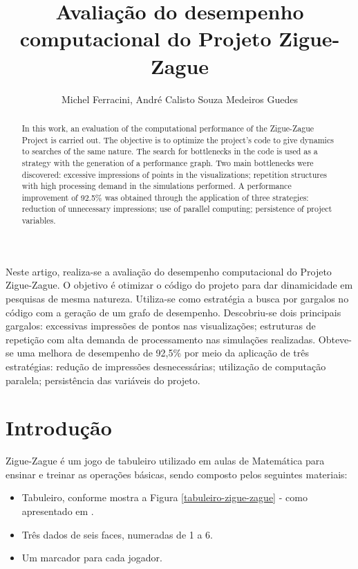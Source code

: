 \documentclass[12pt]{article}
\title{Avaliação do desempenho computacional do Projeto Zigue-Zague}
\author{Michel Ferracini\inst{1}, André Calisto Souza Medeiros Guedes\inst{1}}
\begin{document}
 

\maketitle

\begin{abstract}
  In this work, an evaluation of the computational performance of the Zigue-Zague Project is carried out. The objective is to optimize the project's code to give dynamics to searches of the same nature. The search for bottlenecks in the code is used as a strategy with the generation of a performance graph. Two main bottlenecks were discovered: excessive impressions of points in the visualizations; repetition structures with high processing demand in the simulations performed. A performance improvement of 92.5\% was obtained through the application of three strategies: reduction of unnecessary impressions; use of parallel computing; persistence of project variables.
\end{abstract}
     
\begin{resumo} 
Neste artigo, realiza-se a avaliação do desempenho computacional do Projeto Zigue-Zague. O objetivo é otimizar o código do projeto para dar dinamicidade em pesquisas de mesma natureza. Utiliza-se como estratégia a busca por gargalos no código com a geração de um grafo de desempenho. Descobriu-se dois principais gargalos: excessivas impressões de pontos nas visualizações; estruturas de repetição com alta demanda de processamento nas simulações realizadas. Obteve-se uma melhora de desempenho de 92,5\% por meio da aplicação de três estratégias: redução de impressões desnecessárias; utilização de computação paralela; persistência das variáveis do projeto. 
\end{resumo}

\section{Introdução}

Zigue-Zague é um jogo de tabuleiro utilizado em aulas de Matemática para ensinar e treinar as operações básicas, sendo composto pelos seguintes materiais:

\begin{itemize}
	\item Tabuleiro, conforme mostra a Figura \ref{tabuleiro-zigue-zague} - como apresentado em \cite{silvakodama:2007}.
	\item Três dados de seis faces, numeradas de 1 a 6.
	\item Um marcador para cada jogador.
\end{itemize}
\end{document}
